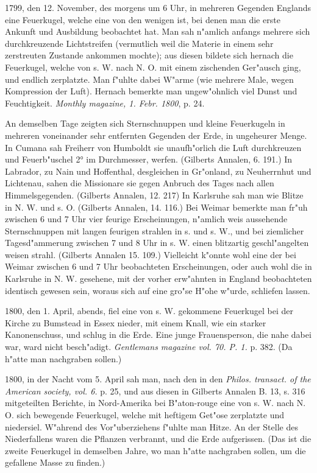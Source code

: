 \documentclass[a4paper, 11pt, oneside, polutonikogreek, german]{article}
\begin{document}
1799, den 12. November, des morgens um 6 Uhr, in mehreren Gegenden Englands eine Feuerkugel, welche eine von den wenigen ist, bei denen man die erste Ankunft und Ausbildung beobachtet hat. Man sah n"amlich anfangs mehrere sich durchkreuzende Lichtstreifen (vermutlich weil die Materie in einem sehr zerstreuten Zustande ankommen mochte); aus diesen bildete sich hernach die Feuerkugel, welche von s. W. nach N. O. mit einem zischenden Ger"ausch ging, und endlich zerplatzte. Man f"uhlte dabei W"arme (wie mehrere Male, wegen Kompression der Luft). Hernach bemerkte man ungew"ohnlich viel Dunst und Feuchtigkeit. \emph{Monthly magazine, 1. Febr. 1800}, p. 24.

An demselben Tage zeigten sich Sternschnuppen und kleine Feuerkugeln in mehreren voneinander sehr entfernten Gegenden der Erde, in ungeheurer Menge. In Cumana sah Freiherr von Humboldt sie unaufh"orlich die Luft durchkreuzen und Feuerb"uschel 2° im Durchmesser, werfen. (Gilberts Annalen, 6. 191.) In Labrador, zu Nain und Hoffenthal, desgleichen in Gr"onland, zu Neuherrnhut und Lichtenau, sahen die Missionare sie gegen Anbruch des Tages nach allen Himmelsgegenden. (Gilberts Annalen, 12. 217) In Karlsruhe sah man wie Blitze in N. W. und s. O. (Gilberts Annalen, 14. 116.) Bei Weimar bemerkte man fr"uh zwischen 6 und 7 Uhr vier feurige Erscheinungen, n"amlich weis aussehende Sternschnuppen mit langen feurigen strahlen in s. und s. W., und bei ziemlicher Tagesd"ammerung zwischen 7 und 8 Uhr in s. W. einen blitzartig geschl"angelten weisen strahl. (Gilberts Annalen 15. 109.) Vielleicht k"onnte wohl eine der bei Weimar zwischen 6 und 7 Uhr beobachteten Erscheinungen, oder auch wohl die in Karlsruhe in N. W. gesehene, mit der vorher erw"ahnten in England beobachteten identisch gewesen sein, woraus sich auf eine gro"se H"ohe w"urde, schliefen lassen.

1800, den 1. April, abends, fiel eine von s. W. gekommene Feuerkugel bei der Kirche zu Bumstead in Essex nieder, mit einem Knall, wie ein starker Kanonenschuss, und schlug in die Erde. Eine junge Frauensperson, die nahe dabei war, ward nicht besch"adigt. \emph{Gentlemans magazine vol. 70. P. 1.} p. 382. (Da h"atte man nachgraben sollen.)

1800, in der Nacht vom 5. April sah man, nach den in den \emph{Philos. transact. of the American society, vol. 6.} p. 25, und aus diesen in Gilberts Annalen B. 13, s. 316 mitgeteilten Berichte, in Nord-Amerika bei B"aton-rouge eine von s. W. nach N. O. sich bewegende Feuerkugel, welche mit heftigem Get"ose zerplatzte und niedersiel. W"ahrend des Vor"uberziehens f"uhlte man Hitze. An der Stelle des Niederfallens waren die Pflanzen verbrannt, und die Erde aufgerissen. (Das ist die zweite Feuerkugel in demselben Jahre, wo man h"atte nachgraben sollen, um die gefallene Masse zu finden.)
\end{document}
